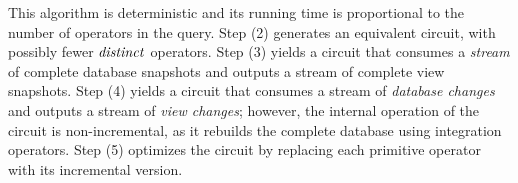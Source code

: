 This algorithm is deterministic and its running time is proportional
to the number of operators in the query.  Step (2) generates an
equivalent circuit, with possibly fewer $\mathit{distinct}$ operators.  Step
(3) yields a circuit that consumes a \emph{stream} of complete
database snapshots and outputs a stream of complete view
snapshots. Step (4) yields a circuit that consumes a stream of
\emph{database changes} and outputs a stream of \emph{view changes};
however, the internal operation of the circuit is non-incremental, as
it rebuilds the complete database using integration operators.  Step
(5) optimizes the circuit by replacing each primitive operator with
its incremental version.




